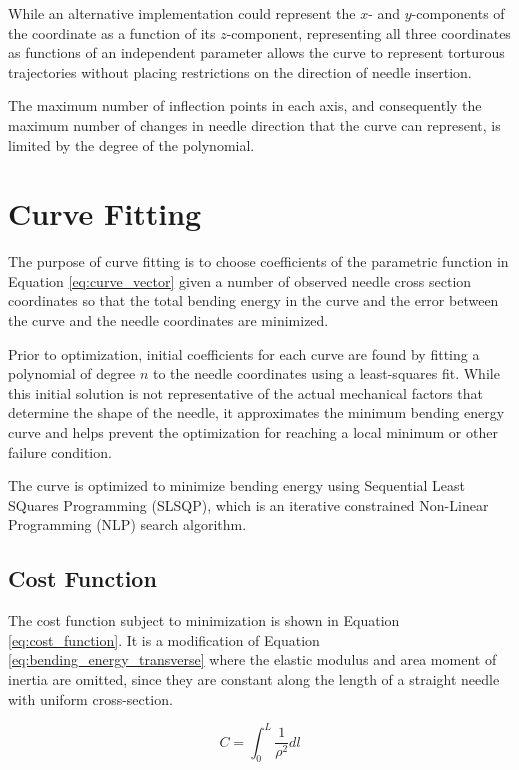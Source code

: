 While an alternative implementation could represent the $x$- and $y$-components of the coordinate as a function of its $z$-component, representing all three coordinates as functions of an independent parameter allows the curve to represent torturous trajectories without placing restrictions on the direction of needle insertion.

The maximum number of inflection points in each axis, and consequently the maximum number of changes in needle direction that the curve can represent, is limited by the degree of the polynomial.

\section{Curve Fitting}
The purpose of curve fitting is to choose coefficients of the parametric function in Equation \ref{eq:curve_vector} given a number of observed needle cross section coordinates so that the total bending energy in the curve and the error between the curve and the needle coordinates are minimized.

Prior to optimization, initial coefficients for each curve are found by fitting a polynomial of degree $n$ to the needle coordinates using a least-squares fit. While this initial solution is not representative of the actual mechanical factors that determine the shape of the needle, it approximates the minimum bending energy curve and helps prevent the optimization for reaching a local minimum or other failure condition.

The curve is optimized to minimize bending energy using Sequential Least SQuares Programming (SLSQP), which is an iterative constrained Non-Linear Programming (NLP) search algorithm\cite{kraft_software_1988}.

\subsection{Cost Function}
The cost function subject to minimization is shown in Equation \ref{eq:cost_function}. It is a modification of Equation \ref{eq:bending_energy_transverse} where the elastic modulus and area moment of inertia are omitted, since they are constant along the length of a straight needle with uniform cross-section.

\begin{equation}
\label{eq:cost_function}
C = \int_{0}^{L} \frac{1}{\rho^2}dl
\end{equation}

